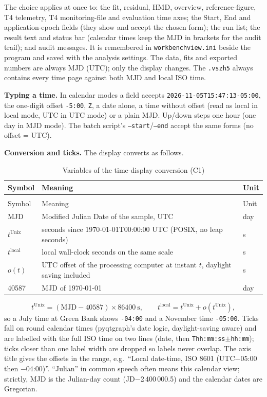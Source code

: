 \documentclass[11pt,a4paper]{article}
\makeatletter
\renewcommand{\_}{\usscore\allowbreak}
\newenvironment{vartable}[2]{%
 \par\small\setlength{\LTpre}{3pt}\setlength{\LTpost}{3pt}%
 \begin{longtable}{@{}>{\raggedright}p{.2\linewidth}>{\raggedright}p{.57\linewidth}>{\raggedright\arraybackslash}p{.17\linewidth}@{}}
 \caption{#2}\label{#1}\\
 \toprule Symbol & Meaning & Unit\\\midrule
 \endfirsthead
 \multicolumn{3}{@{}l}{\footnotesize\itshape Table \thetable{} (continued)}\\
 \toprule Symbol & Meaning & Unit\\\midrule
 \endhead
 \bottomrule
 \endlastfoot}
 {\end{longtable}\normalsize}
\makeatother
\begin{document}
The choice applies at once to: the fit, residual, HMD, overview, reference-figure, T4 telemetry,
T4 monitoring-file and evaluation time axes; the Start, End and application-epoch fields (they show
and accept the chosen form); the run list; the result text and status bar (calendar times keep the
MJD in brackets for the audit trail); and audit messages. It is remembered in
\texttt{workbench\_view.ini} beside the program and saved with the analysis settings. The data, fits
and exported numbers are always MJD (UTC); only the display changes. The \texttt{.vszh5} always
contains every time page against both MJD and local ISO time.

\textbf{Typing a time.} In calendar modes a field accepts \texttt{2026-11-05T15:47:13-05:00}, the one-digit
offset \texttt{-5:00}, \texttt{Z}, a date alone, a time without offset (read as local in local mode, UTC in
UTC mode) or a plain MJD. Up/down steps one hour (one day in MJD mode). The batch script's
\texttt{--start}/\texttt{--end} accept the same forms (no offset = UTC).

\textbf{Conversion and ticks.} The display converts as follows.
\begin{vartable}{tab:var-C}{Variables of the time-display conversion (C1)}
MJD & Modified Julian Date of the sample, UTC & day\\
\(t^{\mathrm{Unix}}\) & seconds since 1970-01-01T00:00:00 UTC (POSIX, no leap seconds) & s\\
\(t^{\mathrm{local}}\) & local wall-clock seconds on the same scale & s\\
\(o(t)\) & UTC offset of the processing computer at instant \(t\), daylight saving included & s\\
40587 & MJD of 1970-01-01 & day\\
\end{vartable}
\begin{equation}
t^{\mathrm{Unix}}=(\mathrm{MJD}-40587)\times86400\ \mathrm{s},\qquad
t^{\mathrm{local}}=t^{\mathrm{Unix}}+o(t^{\mathrm{Unix}}), \tag{C1}\label{eq:C1}
\end{equation}
so a July time at Green Bank shows \texttt{-04:00} and a November time \texttt{-05:00}. Ticks
fall on round calendar times (pyqtgraph's date logic, daylight-saving aware) and are labelled with
the full ISO time on two lines (date, then \texttt{Thh:mm:ss$\pm$hh:mm}); ticks closer than one label
width are dropped so labels never overlap. The axis title gives the offsets in the range, e.g.\
``Local date-time, ISO 8601 (UTC$-$05:00 then $-$04:00)''. ``Julian'' in common speech often means
this calendar view; strictly, MJD is the Julian-day count (JD$-$2\,400\,000.5) and the calendar
dates are Gregorian.
\end{document}
